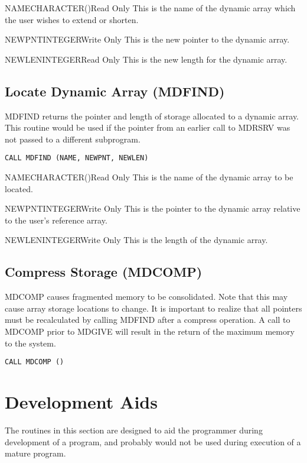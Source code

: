 \begin{argy}{NAME}{CHARACTER\last(\last)}{Read Only}
This is the name of the dynamic array which the user wishes to extend or
shorten.
\end{argy}

\begin{argy}{NEWPNT}{INTEGER}{Write Only}
This is the new pointer to the dynamic array.
\end{argy}

\begin{argy}{NEWLEN}{INTEGER}{Read Only}
This is the new length for the dynamic array.
\end{argy}

\subsection{Locate Dynamic Array (MDFIND)}
MDFIND returns the pointer and length of storage allocated to a dynamic
array.  This routine would be used if the pointer from an earlier call to
MDRSRV was not passed to a different subprogram.

\verb+CALL MDFIND (NAME, NEWPNT, NEWLEN)+

\begin{argy}{NAME}{CHARACTER\last(\last)}{Read Only}
This is the name of the dynamic array to be located.
\end{argy}

\begin{argy}{NEWPNT}{INTEGER}{Write Only}
This is the pointer to the dynamic array relative to the user's reference
array.
\end{argy}

\begin{argy}{NEWLEN}{INTEGER}{Write Only}
This is the length of the dynamic array.
\end{argy}

\subsection{Compress Storage (MDCOMP)}
MDCOMP causes fragmented memory to be consolidated.  Note that this may
cause array storage locations to change.  It is important to realize that
all pointers must be recalculated by calling MDFIND after a compress
operation.  A call to MDCOMP prior to MDGIVE will result in the return of
the maximum memory to the system.

\verb+CALL MDCOMP ()+


\section{Development Aids}\label{sec:mdev}
The routines in this section are designed to aid the programmer during
development of a program, and probably would not be used during execution of
a mature program.

